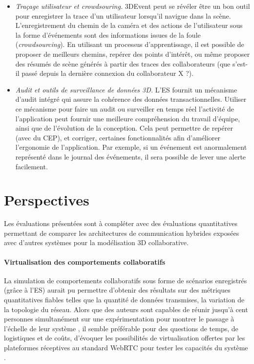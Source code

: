 \begin{itemize}
	\item \textit{Traçage utilisateur et \textit{crowdsouring}.} 3DEvent peut se révéler être 
	un bon outil pour enregistrer la trace d'un utilisateur lorsqu'il navigue dans la 
	scène. L'enregistrement du chemin de la caméra et des actions de l'utilisateur 
	sous la forme d'événements sont des informations 
	\og issues de la foule\fg{} (\textit{crowdsourcing}). En utilisant un processus 
	d'apprentissage, il est possible de proposer de meilleurs chemins, repérer des 
	points d'intérêt, ou même proposer des résumés de scène générés à partir des 
	traces des collaborateurs (que s'est-il passé depuis la dernière connexion du 
	collaborateur X ?).
	\item \textit{Audit et outils de surveillance de données 3D.} L'\gls{ES} fournit un 
	mécanisme 
	d'audit intégré qui assure la cohérence des données transactionnelles. Utiliser 
	ce mécanisme pour faire un audit ou surveiller en temps réel l'activité de 
	l'application peut fournir une meilleure compréhension du travail d'équipe, ainsi 
	que de l'évolution de la conception. Cela peut permettre de repérer (avec du 
	\gls{CEP}), et corriger, certaines fonctionnalités afin d'améliorer l'ergonomie de 
	l'application. Par exemple, si un événement est anormalement représenté dans 
	le journal des événements, il sera possible de lever une alerte facilement.
\end{itemize}

\section{Perspectives}
Les évaluations présentées sont à compléter avec des évaluations quantitatives 
permettant de comparer les architectures de communication hybrides exposées avec 
d'autres systèmes pour la modélisation 3D collaborative. 

\paragraph{Virtualisation des comportements collaboratifs}
La simulation de comportements 
collaboratifs sous forme de scénarios enregistrés (grâce à l'\gls{ES}) aurait pu 
permettre d'obtenir des résultats sur des métriques quantitatives fiables telles que la 
quantité de données transmises, la variation de la topologie du 
réseau. Alors que des auteurs sont capables de réunir jusqu'à cent personnes 
simultanément sur une expérimentation pour montrer le passage à l'échelle de leur 
système \cite{Hu2017}, il semble préférable pour des questions de temps, de 
logistiques et de coûts, d'évoquer les possibilités de virtualisation offertes par les 
plateformes réceptives au standard WebRTC pour tester les capacités du système 
\cite{}.

